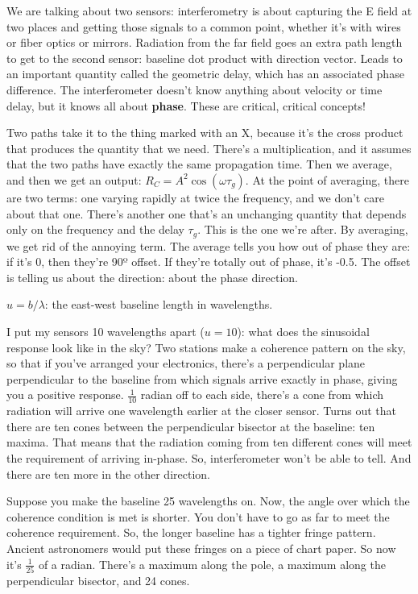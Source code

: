 \documentclass[a4paper]{article}
\begin{document}
We are talking about two sensors: interferometry is about capturing the E field at two places and getting those signals to a common point, whether it's with wires or fiber optics or mirrors. Radiation from the far field goes an extra path length to get to the second sensor: baseline dot product with direction vector. Leads to an important quantity called the geometric delay, which has an associated phase difference. The interferometer doesn't know anything about velocity or time delay, but it knows all about \textbf{phase}. These are critical, critical concepts!

Two paths take it to the thing marked with an X, because it's the cross product that produces the quantity that we need. There's a multiplication, and it assumes that the two paths have exactly the same propagation time. Then we average, and then we get an output: $R_C = A^2 \cos (\omega \tau_g)$. At the point of averaging, there are two terms: one varying rapidly at twice the frequency, and we don't care about that one. There's another one that's an unchanging quantity that depends only on the frequency and the delay $\tau_g$. This is the one we're after. By averaging, we get rid of the annoying term. The average tells you how out of phase they are: if it's 0, then they're 90º offset. If they're totally out of phase, it's -0.5. The offset is telling us about the direction: about the phase direction. 

$u = b / \lambda$: the east-west baseline length in wavelengths. 

I put my sensors 10 wavelengths apart ($u = 10$): what does the sinusoidal response look like in the sky? Two stations make a coherence pattern on the sky, so that if you've arranged your electronics, there's a perpendicular plane perpendicular to the baseline from which signals arrive exactly in phase, giving you a positive response. $\frac{1}{10}$ radian off to each side, there's a cone from which radiation will arrive one wavelength earlier at the closer sensor. Turns out that there are ten cones between the perpendicular bisector at the baseline: ten maxima. That means that the radiation coming from ten different cones will meet the requirement of arriving in-phase. So, interferometer won't be able to tell. And there are ten more in the other direction. 

Suppose you make the baseline 25 wavelengths on. Now, the angle over which the coherence condition is met is shorter. You don't have to go as far to meet the coherence requirement. So, the longer baseline has a tighter fringe pattern. Ancient astronomers would put these fringes on a piece of chart paper. So now it's $\frac{1}{25}$ of a radian. There's a maximum along the pole, a maximum along the perpendicular bisector, and 24 cones. 
\end{document}
